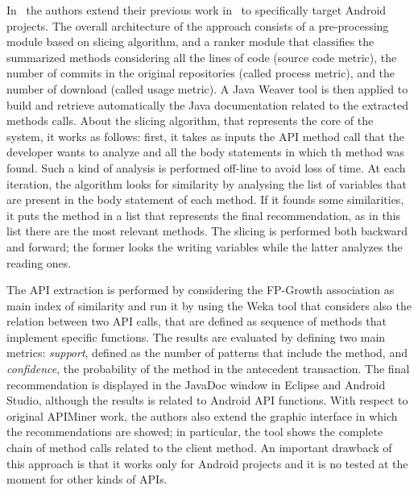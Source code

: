In~\cite{borges_mining_2015} the authors extend their previous work 
in~\cite{montandon_documenting_2013} to specifically target Android projects.  
%
The overall architecture of the approach consists of a pre-processing module 
based on slicing algorithm, and a ranker module that classifies the summarized 
methods  considering all the lines of code (source code metric), the number of 
commits in the original repositories (called process metric), and the number of 
download (called usage metric). A Java Weaver tool is then applied to build and 
retrieve automatically the Java documentation related to the extracted methods 
calls. About the slicing algorithm, that represents the core of the system, it 
works as follows: first, it takes as inputs the API method call that the 
developer wants to analyze and all the body statements in which th method was 
found. Such a kind of analysis is performed off-line to avoid loss of time. At 
each iteration, the algorithm looks for similarity by analysing the list of 
variables that are present in the body statement of each method. If it founds 
some similarities, it puts the method in a list that represents the final 
recommendation, as in this list there are the most relevant methods. The 
slicing is performed both backward and forward; the former looks the writing 
variables while the latter analyzes the reading ones. 

The API extraction is performed by considering the FP-Growth association as 
main index of similarity and run it by using the Weka tool that considers also 
the relation between two API calls, that are defined as sequence of methods 
that implement specific functions. The results are evaluated by defining two 
main metrics: \textit{support}, defined as the number of patterns that include 
the method, and \textit{confidence}, the probability of the method in the 
antecedent transaction. The final recommendation is displayed in the JavaDoc 
window in Eclipse and Android Studio, although the results is related to 
Android API functions. With respect to original APIMiner work, the authors also 
extend the graphic interface in which the recommendations are showed; in 
particular, the tool shows the complete chain of method calls related to the 
client method. An important drawback of this approach is that it works only for 
Android projects and it is no tested at the moment for other kinds of APIs.


